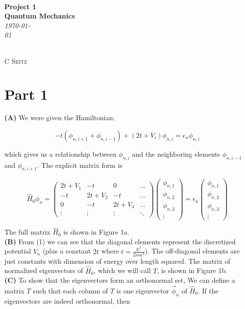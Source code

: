 \documentclass[12pt]{article}
\theoremstyle{definition}
\begin{document}
 {\noindent\Huge\bf  \\[0.5\baselineskip] {\selectfont  Project 1}         }\\[2\baselineskip] %
{ {\bf {}\selectfont Quantum Mechanics}\\ {\textit{\selectfont     \today}}}~~~~~~~~~~~~~~~~~~~~~~~~~~~~~~~~~~~~~~~~~~~~~~~~~~~~~~~~~~~~~~~~~~~~~~~~~~~~~    {\large \textsc{C Seitz}
\\[1.4\baselineskip] 

\section{Part 1}

\textbf{(A)} We were given the Hamiltonian:

\begin{equation*}
-t(\phi_{n,i+1} + \phi_{n,i-1}) + (2t+V_{i})\phi_{n,i} = \epsilon_{n}\phi_{n,i}
\end{equation*}

which gives us a relationship between $\phi_{n,i}$ and the neighboring elements $\phi_{n,i-1}$ and $\phi_{n,i+1}$. The explicit matrix form is

\begin{equation}
\hat{H}_{0}\phi_{n} = \begin{pmatrix}
2t + V_{1} & -t & 0 & \hdots\\
-t & 2t + V_{2} & -t& \hdots\\
0 & -t & 2t + V_{3}& \hdots\\
\vdots & \vdots & \vdots & \ddots
\end{pmatrix}
\begin{pmatrix}
\phi_{n,1}\\
\phi_{n,2}\\
\phi_{n,3}\\
\vdots
\end{pmatrix} = \epsilon_{n}\begin{pmatrix}
\phi_{n,1}\\
\phi_{n,2}\\
\phi_{n,3}\\
\vdots
\end{pmatrix}
\end{equation}

The full matrix $\hat{H}_{0}$ is shown in Figure 1a. 
\vspace{0.1in}\\
\noindent \textbf{(B)} From (1) we can see that the diagonal elements represent the discretized potential $V_{n}$ (plus a constant $2t$ where $t = \frac{\hbar^{2}}{2ma^{2}}$). The off-diagonal elements are just constants with dimension of energy over length squared. The matrix of normalized eigenvectors of $\hat{H}_{0}$, which we will call $T$, is shown in Figure 1b.
\vspace{0.1in}\\
\noindent\textbf{(C)} To show that the eigenvectors form an orthonormal set, We can define a matrix $T$ such that each column of $T$ is one eigenvector $\vec{\phi}_{n}$ of $\hat{H}_{0}$. If the eigenvectors are indeed orthonormal, then

}
\end{document}
